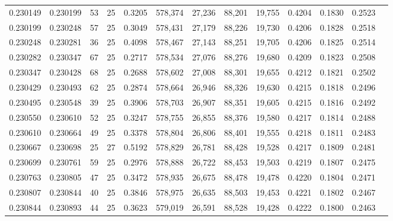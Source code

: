 \begin{tabular}{rrrrrrrrrrrrr}
0.230149 & 0.230199 &    53 &  25 &                                     0.3205 & 578,374 &  27,236 &  88,201 &  19,755 & 0.4204 & 0.1830 & 0.2523 \\
0.230199 & 0.230248 &    57 &  25 &                                     0.3049 & 578,431 &  27,179 &  88,226 &  19,730 & 0.4206 & 0.1828 & 0.2518 \\
0.230248 & 0.230281 &    36 &  25 &                                     0.4098 & 578,467 &  27,143 &  88,251 &  19,705 & 0.4206 & 0.1825 & 0.2514 \\
0.230282 & 0.230347 &    67 &  25 &                                     0.2717 & 578,534 &  27,076 &  88,276 &  19,680 & 0.4209 & 0.1823 & 0.2508 \\
0.230347 & 0.230428 &    68 &  25 &                                     0.2688 & 578,602 &  27,008 &  88,301 &  19,655 & 0.4212 & 0.1821 & 0.2502 \\
0.230429 & 0.230493 &    62 &  25 &                                     0.2874 & 578,664 &  26,946 &  88,326 &  19,630 & 0.4215 & 0.1818 & 0.2496 \\
0.230495 & 0.230548 &    39 &  25 &                                     0.3906 & 578,703 &  26,907 &  88,351 &  19,605 & 0.4215 & 0.1816 & 0.2492 \\
0.230550 & 0.230610 &    52 &  25 &                                     0.3247 & 578,755 &  26,855 &  88,376 &  19,580 & 0.4217 & 0.1814 & 0.2488 \\
0.230610 & 0.230664 &    49 &  25 &                                     0.3378 & 578,804 &  26,806 &  88,401 &  19,555 & 0.4218 & 0.1811 & 0.2483 \\
0.230667 & 0.230698 &    25 &  27 &                                     0.5192 & 578,829 &  26,781 &  88,428 &  19,528 & 0.4217 & 0.1809 & 0.2481 \\
0.230699 & 0.230761 &    59 &  25 &                                     0.2976 & 578,888 &  26,722 &  88,453 &  19,503 & 0.4219 & 0.1807 & 0.2475 \\
0.230763 & 0.230805 &    47 &  25 &                                     0.3472 & 578,935 &  26,675 &  88,478 &  19,478 & 0.4220 & 0.1804 & 0.2471 \\
0.230807 & 0.230844 &    40 &  25 &                                     0.3846 & 578,975 &  26,635 &  88,503 &  19,453 & 0.4221 & 0.1802 & 0.2467 \\
0.230844 & 0.230893 &    44 &  25 &                                     0.3623 & 579,019 &  26,591 &  88,528 &  19,428 & 0.4222 & 0.1800 & 0.2463 \\

\end{tabular}

